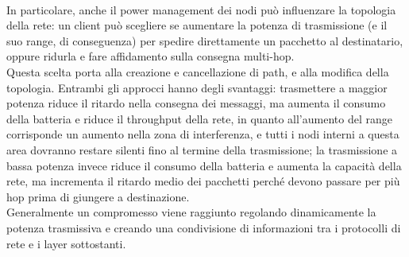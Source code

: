 \\
In particolare, anche il power management dei nodi può influenzare la topologia della rete: un client può scegliere se aumentare la potenza di trasmissione (e il suo range, di conseguenza) per spedire direttamente un pacchetto al destinatario, oppure ridurla e fare affidamento sulla consegna multi-hop.\\
Questa scelta porta alla creazione e cancellazione di path, e alla modifica della topologia. 
Entrambi gli approcci hanno degli svantaggi: trasmettere a maggior potenza riduce il ritardo nella consegna dei messaggi, ma aumenta il consumo della batteria e riduce il throughput della rete, in quanto all'aumento del range corrisponde un aumento nella zona di interferenza, e tutti i nodi interni a questa area dovranno restare silenti fino al termine della trasmissione; la trasmissione a bassa potenza invece riduce il consumo della batteria e aumenta la capacità della rete, ma incrementa il ritardo medio dei pacchetti perché devono passare per più hop prima di giungere a destinazione. \\
Generalmente un compromesso viene raggiunto regolando dinamicamente la potenza trasmissiva e creando una condivisione di informazioni tra i protocolli di rete e i layer sottostanti. \cite{self organizing, self healing networks}

